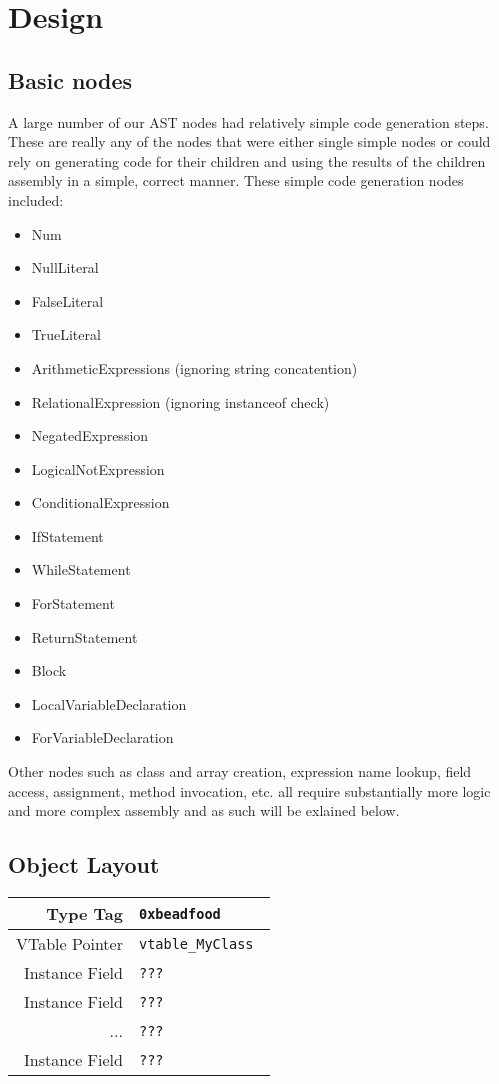 \documentclass[letterpaper]{article}
\begin{document}
  \section{Design}

  \subsection{Basic nodes}

  A large number of our AST nodes had relatively simple code generation steps.
  These are really any of the nodes that were either single simple nodes or
  could rely on generating code for their children and using the results of the
  children assembly in a simple, correct manner. These simple code generation
  nodes included:

  \begin{itemize}
    \item Num
    \item NullLiteral
    \item FalseLiteral
    \item TrueLiteral
    \item ArithmeticExpressions (ignoring string concatention)
    \item RelationalExpression (ignoring instanceof check)
    \item NegatedExpression
    \item LogicalNotExpression
    \item ConditionalExpression
    \item IfStatement
    \item WhileStatement
    \item ForStatement
    \item ReturnStatement
    \item Block
    \item LocalVariableDeclaration
    \item ForVariableDeclaration
  \end{itemize}

  Other nodes such as class and array creation, expression name lookup,
  field access, assignment, method invocation, etc. all require substantially
  more logic and more complex assembly and as such will be exlained below.

  \subsection{Object Layout}

  \begin{center}
  \begin{tabular}{| r | l |}
    \hline
    Type Tag & {\tt 0xbeadfood } \\ \hline
    VTable Pointer & {\tt vtable\_MyClass } \\ \hline
    Instance Field & {\tt ??? } \\ 
    Instance Field & {\tt ??? } \\ 
    ... & {\tt ??? } \\ 
    Instance Field & {\tt ??? } \\ \hline
  \end{tabular}
\end{center}
\end{document}
